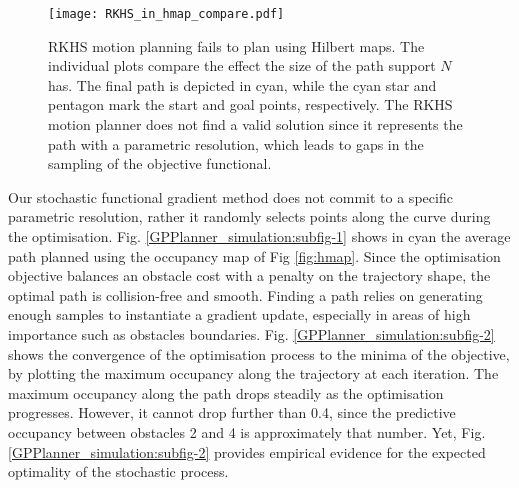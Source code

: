 \documentclass[letterpaper, 10 pt, conference]{ieeeconf}  %
\begin{document}
\begin{figure}[thpb]
	
	\centering
	
	\texttt{[image: RKHS\_in\_hmap\_compare.pdf]}
	
	\caption{RKHS motion planning \cite{Marinho2016} fails to plan using Hilbert maps. The individual plots compare the effect the size of the path support $N$ has. The final path is depicted in cyan, while the cyan star and pentagon mark the start and goal points, respectively. The RKHS motion planner does not find a valid solution since it represents the path with a parametric resolution, which leads to gaps in the sampling of the objective functional.}
	\label{fig:RKHS_hmap_compare}
\end{figure}

Our stochastic functional gradient method does not commit to a specific parametric resolution, rather it randomly selects points along the curve during the optimisation. Fig. \ref{GPPlanner_simulation:subfig-1} shows in cyan the average path planned using the occupancy map of Fig \ref{fig:hmap}. Since the optimisation objective balances an obstacle cost with a penalty on the trajectory shape, the optimal path is collision-free and smooth. Finding a path relies on generating enough samples to instantiate a gradient update, especially in areas of high importance such as obstacles boundaries. Fig. \ref{GPPlanner_simulation:subfig-2} shows the convergence of the optimisation process to the minima of the objective, by plotting the maximum occupancy along the trajectory at each iteration. The maximum occupancy along the path drops steadily as the optimisation progresses. However, it cannot drop further than 0.4, since the predictive occupancy between obstacles 2 and 4 is approximately that number. Yet, Fig. \ref{GPPlanner_simulation:subfig-2} provides empirical evidence for the expected optimality of the stochastic process.       
\end{document}
